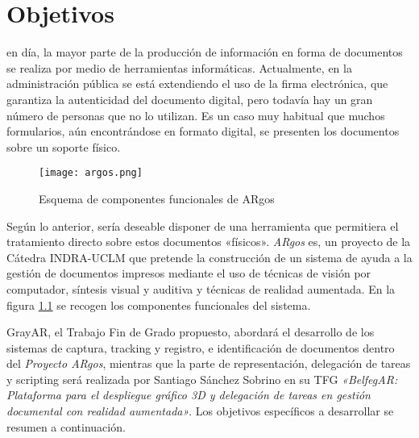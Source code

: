 \chapter{Objetivos}
\label{chap:objetivos}

 en día, la mayor parte de la producción de información en forma de documentos se realiza por medio de herramientas informáticas. Actualmente, en la administración pública se está extendiendo el uso de la firma electrónica, que garantiza la autenticidad del documento digital, pero todavía hay un gran número de personas que no lo utilizan. Es un caso muy habitual que muchos formularios, aún encontrándose en formato digital, se presenten los documentos sobre un soporte físico. %
\begin{figure}[h!]
  \begin{center}
      \texttt{[image: argos.png]}
      \caption{Esquema de componentes funcionales de ARgos}
      \label{fig:diagrama_argos}
    \end{center}
\end{figure}
   
Según lo anterior, sería deseable disponer de una herramienta que permitiera el tratamiento directo sobre estos documentos «físicos». \textit{ARgos} es, un proyecto de la Cátedra INDRA-UCLM que pretende la construcción de un sistema de ayuda a la gestión de documentos impresos mediante el uso de técnicas de visión por computador, síntesis visual y auditiva y técnicas de realidad aumentada. En la figura \ref{fig:diagrama_argos} se recogen los componentes funcionales del sistema.


GrayAR, el Trabajo Fin de Grado propuesto, abordará el desarrollo de los sistemas de captura, tracking y registro, e identificación de documentos dentro del \textit{Proyecto ARgos}, mientras que la parte de representación, delegación de tareas y scripting será realizada por Santiago Sánchez Sobrino en su TFG \textit{«BelfegAR: Plataforma para el despliegue gráfico 3D y delegación de tareas en gestión documental con realidad aumentada»}. Los objetivos específicos a desarrollar se resumen a continuación.   

